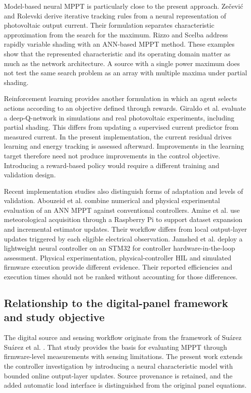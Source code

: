 \documentclass[Acad.Energy.,researcharticle,9pt,twoside,oneauthor]{Definitions/jams_academia}
\begin{document}
Model-based neural MPPT is particularly close to the present approach. Zečević and Rolevski \cite{nnmodel} derive iterative tracking rules from a neural representation of photovoltaic output current. Their formulation separates characteristic approximation from the search for the maximum. Rizzo and Scelba \cite{rizzo} address rapidly variable shading with an ANN-based MPPT method. These examples show that the represented characteristic and its operating domain matter as much as the network architecture. A source with a single power maximum does not test the same search problem as an array with multiple maxima under partial shading.

Reinforcement learning provides another formulation in which an agent selects actions according to an objective defined through rewards. Giraldo et al. \cite{giraldo} evaluate a deep-Q-network in simulations and real photovoltaic experiments, including partial shading. This differs from updating a supervised current predictor from measured current. In the present implementation, the current residual drives learning and energy tracking is assessed afterward. Improvements in the learning target therefore need not produce improvements in the control objective. Introducing a reward-based policy would require a different training and validation design.

Recent implementation studies also distinguish forms of adaptation and levels of validation. Abouzeid et al. \cite{abouzeid} combine numerical and physical experimental evaluation of an ANN MPPT against conventional controllers. Amine et al. \cite{amine} use meteorological acquisition through a Raspberry Pi to support dataset expansion and incremental estimator updates. Their workflow differs from local output-layer updates triggered by each eligible electrical observation. Jamshed et al. \cite{jamshed} deploy a lightweight neural controller on an STM32 for controller hardware-in-the-loop assessment. Physical experimentation, physical-controller HIL and simulated firmware execution provide different evidence. Their reported efficiencies and execution times should not be ranked without accounting for those differences.

\subsection{Relationship to the digital-panel framework and study objective}
The digital source and sensing workflow originate from the framework of Suárez Suárez et al. \cite{suarez}. That study provides the basis for evaluating MPPT through firmware-level measurements with sensing limitations. The present work extends the controller investigation by introducing a neural characteristic model with bounded online output-layer updates. Source provenance is retained, and the added automatic load interface is distinguished from the original panel equations.
\end{document}
